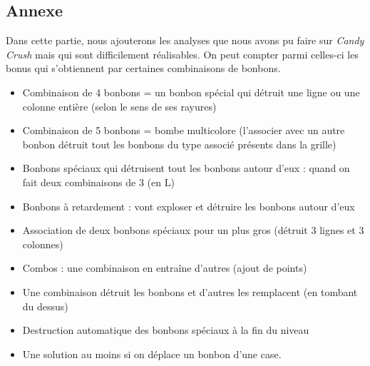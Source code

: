 \subsection{Annexe}
Dans cette partie, nous ajouterons les analyses que nous avons pu faire sur \emph{Candy Crush} mais qui sont difficilement réalisables.
On peut compter parmi celles-ci les bonus qui s'obtiennent par certaines combinaisons de bonbons.
\begin{itemize}

\item
	Combinaison de 4 bonbons = un bonbon spécial qui détruit une ligne ou une colonne entière (selon le sens de ses rayures)
\item
	Combinaison de 5 bonbons = bombe multicolore (l'associer avec un autre bonbon détruit tout les bonbons du type associé présents dans la grille)
\item
	Bonbons spéciaux qui détruisent tout les bonbons autour d'eux : quand on fait deux combinaisons de 3 (en L)
\item
	Bonbons à retardement : vont exploser et détruire les bonbons autour d'eux 
\item
	Association de deux bonbons spéciaux pour un plus gros (détruit 3 lignes et 3 colonnes)      
\item
	Combos : une combinaison en entraîne d'autres (ajout de points)
\item
	Une combinaison détruit les bonbons et d'autres les remplacent (en tombant du dessus) %
\item
	Destruction automatique des bonbons spéciaux à la fin du niveau
\item
	Une solution au moins si on déplace un bonbon d'une case.
\end{itemize}
